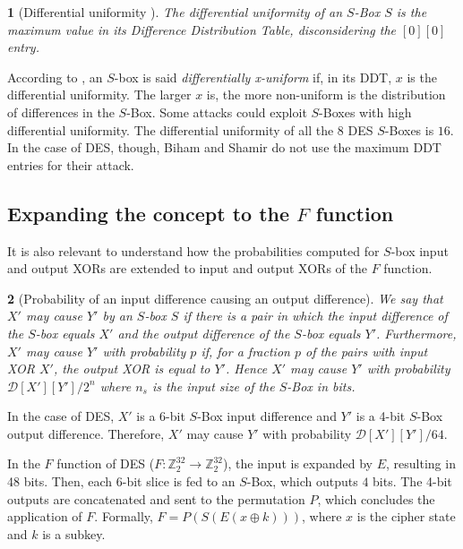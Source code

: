 \documentclass{report}
\newtheorem*{concept}{}{\bfseries}{\itshape}
\begin{document}
\begin{concept}[Differential uniformity \cite{Nyberg1993DifferentiallyUM}]
The differential uniformity of an $S$-Box $S$ is the maximum value in its Difference Distribution Table, disconsidering the $[0][0]$ entry.
\end{concept}

According to \cite{Nyberg1993DifferentiallyUM}, an $S$-box is said \emph{differentially x-uniform} if, in its DDT, $x$ is the differential uniformity. The larger $x$ is, the more non-uniform is the distribution of differences in the $S$-Box. Some attacks could exploit $S$-Boxes with high differential uniformity. The differential uniformity of all the 8 DES $S$-Boxes is $16$. In the case of DES, though, Biham and Shamir do not use the maximum DDT entries for their attack.

\subsection{Expanding the concept to the $F$ function}

It is also relevant to understand how the probabilities computed for $S$-box input and output XORs are extended to input and output XORs of the $F$ function.

\begin{concept}[Probability of an input difference causing an output difference]
We say that $X'$ may cause $Y'$ by an $S$-box $S$ if there is a pair in which the input difference of the $S$-box equals $X'$ and the output difference of the $S$-box equals $Y'$. Furthermore, $X'$ may cause $Y'$ with probability $p$ if, for a fraction $p$ of the pairs with input XOR $X'$, the output XOR is equal to $Y'$. Hence $X'$ may cause $Y'$ with probability $\mathcal{D}[X'][Y'] / 2^n$ where $n_s$ is the input size of the $S$-Box in bits.
\end{concept}

In the case of DES, $X'$ is a 6-bit $S$-Box input difference and $Y'$ is a 4-bit $S$-Box output difference. Therefore, $X'$ may cause $Y'$ with probability $\mathcal{D}[X'][Y'] / 64$.

In the $F$ function of DES ($F: \mathbb{Z}_2^{32} \rightarrow \mathbb{Z}_2^{32}$), the input is expanded by $E$, resulting in 48 bits. Then, each 6-bit slice is fed to an $S$-Box, which outputs $4$ bits. The 4-bit outputs are concatenated and sent to the permutation $P$, which concludes the application of $F$. Formally, $F = P(S(E(x \oplus k)))$, where $x$ is the cipher state and $k$ is a subkey.
\end{document}
